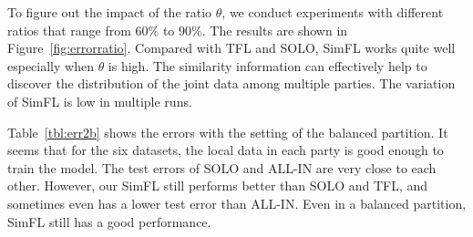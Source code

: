\documentclass[letterpaper]{article} %
\theoremstyle{definition}
\begin{document}
\begin{table}
\centering
\caption{The test errors of different approaches (balanced partition)}
\label{tbl:err2b}
\end{table}

To figure out the impact of the ratio $\theta$, we conduct experiments with different ratios that range from $60\%$ to $90\%$. The results are shown in Figure~\ref{fig:errorratio}. Compared with TFL and SOLO, SimFL works quite well especially when $\theta$ is high. The similarity information can effectively help to discover the distribution of the joint data among multiple parties. The variation of SimFL is low in multiple runs.

Table~\ref{tbl:err2b} shows the errors with the setting of the balanced partition. It seems that for the six datasets, the local data in each party is good enough to train the model. The test errors of SOLO and ALL-IN are very close to each other. However, our SimFL still performs better than SOLO and TFL, and sometimes even has a lower test error than ALL-IN. Even in a balanced partition, SimFL still has a good performance.
\end{document}
